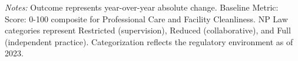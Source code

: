 \begin{table}[htbp]
    \centering
    \caption{Summary of Change in OAS CAHPS: Care \& Cleanliness by Authority and Year}
    \label{tab:d_oas_grp2}
    \vspace{0.2cm}
    \vspace{0.1cm}
    \begin{minipage}{\textwidth}
        \footnotesize \textit{Notes:} Outcome represents year-over-year absolute change. Baseline Metric: Score: 0-100 composite for Professional Care and Facility Cleanliness. NP Law categories represent Restricted (supervision), Reduced (collaborative), and Full (independent practice). Categorization reflects the regulatory environment as of 2023.
    \end{minipage}
\end{table}